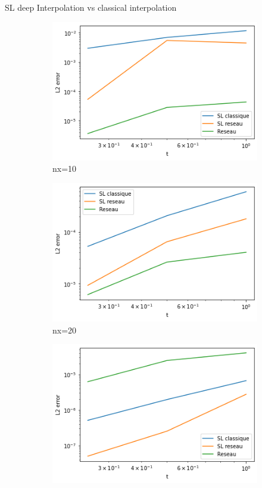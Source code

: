 \begin{frame}{SL deep Interpolation vs classical interpolation}
\begin{figure}
        \begin{subfigure}{0.2\textwidth}
            \centering
            \includegraphics[width=\textwidth]{images/i310.png}
            \caption{nx=10}
        \end{subfigure}
        \begin{subfigure}{0.2\textwidth}
            \centering
            \includegraphics[width=\textwidth]{images/i320.png}
            \caption{nx=20}
        \end{subfigure}
        \begin{subfigure}{0.2\textwidth}
            \centering
            \includegraphics[width=\textwidth]{images/i3.png}

\end{subfigure}
\end{figure}
\end{frame}
